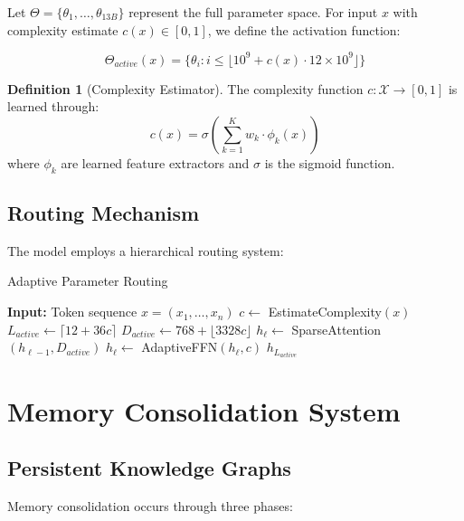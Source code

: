 \documentclass[11pt,a4paper]{article}
\theoremstyle{definition}
\newtheorem{definition}{Definition}
\begin{document}
Let $\Theta = \{\theta_1, \ldots, \theta_{13B}\}$ represent the full parameter space. For input $x$ with complexity estimate $c(x) \in [0,1]$, we define the activation function:

\begin{equation}
\Theta_{active}(x) = \{\theta_i : i \leq \lfloor 10^9 + c(x) \cdot 12 \times 10^9 \rfloor\}
\end{equation}

\begin{definition}[Complexity Estimator]
The complexity function $c: \mathcal{X} \rightarrow [0,1]$ is learned through:
\begin{equation}
c(x) = \sigma\left(\sum_{k=1}^{K} w_k \cdot \phi_k(x)\right)
\end{equation}
where $\phi_k$ are learned feature extractors and $\sigma$ is the sigmoid function.
\end{definition}

\subsection{Routing Mechanism}

The model employs a hierarchical routing system:

\begin{algorithm}
\caption{Adaptive Parameter Routing}
\begin{algorithmic}[1]
\STATE \textbf{Input:} Token sequence $x = (x_1, \ldots, x_n)$
\STATE $c \leftarrow$ EstimateComplexity$(x)$
\STATE $L_{active} \leftarrow \lceil 12 + 36c \rceil$ 
\STATE $D_{active} \leftarrow 768 + \lfloor 3328c \rfloor$ 
    \STATE $h_\ell \leftarrow$ SparseAttention$(h_{\ell-1}, D_{active})$
    \STATE $h_\ell \leftarrow$ AdaptiveFFN$(h_\ell, c)$
\ENDFOR
\RETURN $h_{L_{active}}$
\end{algorithmic}
\end{algorithm}

\section{Memory Consolidation System}

\subsection{Persistent Knowledge Graphs}

Memory consolidation occurs through three phases:
\end{document}
